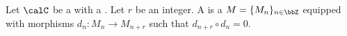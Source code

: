 \begin{definition} \label{definition:differential_graded_object_in_a_category_with_a_zero_object}
    Let $\calC$ be a  with a . Let $r$ be an integer.
    A  is a  $M = \{M_n\}_{n \in \bbZ}$ equipped with morphisms $d_n: M_n \to M_{n+r}$ such that $d_{n+r} \circ d_n = 0$.
\end{definition}